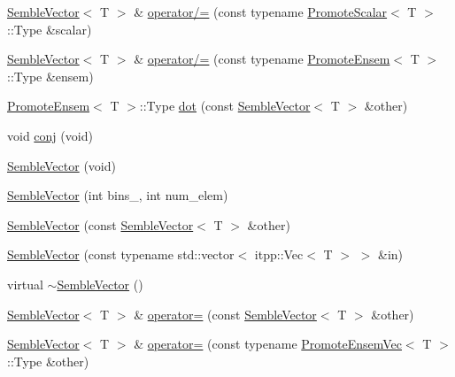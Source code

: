 \begin{DoxyCompactItemize}
\mbox{\hyperlink{structSEMBLE_1_1SembleVector}{Semble\+Vector}}$<$ T $>$ \& \mbox{\hyperlink{structSEMBLE_1_1SembleVector_a4158fb12d451d53f12b9f922d8106630}{operator/=}} (const typename \mbox{\hyperlink{structSEMBLE_1_1PromoteScalar}{Promote\+Scalar}}$<$ T $>$\+::Type \&scalar)
\item 
\mbox{\hyperlink{structSEMBLE_1_1SembleVector}{Semble\+Vector}}$<$ T $>$ \& \mbox{\hyperlink{structSEMBLE_1_1SembleVector_a9533ef56ccd7f84ae674b3ab1c378641}{operator/=}} (const typename \mbox{\hyperlink{structSEMBLE_1_1PromoteEnsem}{Promote\+Ensem}}$<$ T $>$\+::Type \&ensem)
\item 
\mbox{\hyperlink{structSEMBLE_1_1PromoteEnsem}{Promote\+Ensem}}$<$ T $>$\+::Type \mbox{\hyperlink{structSEMBLE_1_1SembleVector_a32f9480a402dc8d53c69fa1b09c03c82}{dot}} (const \mbox{\hyperlink{structSEMBLE_1_1SembleVector}{Semble\+Vector}}$<$ T $>$ \&other)
\item 
void \mbox{\hyperlink{structSEMBLE_1_1SembleVector_a82e42a0a34e836f565f54273df6e5e59}{conj}} (void)
\item 
\mbox{\hyperlink{structSEMBLE_1_1SembleVector_a71d201a7d5b2a62cea4034074fa210f5}{Semble\+Vector}} (void)
\item 
\mbox{\hyperlink{structSEMBLE_1_1SembleVector_a84340fccafe642a4754727fbc95e6356}{Semble\+Vector}} (int bins\+\_\+, int num\+\_\+elem)
\item 
\mbox{\hyperlink{structSEMBLE_1_1SembleVector_a929ee26afcab4cb287ad02440bb6bde2}{Semble\+Vector}} (const \mbox{\hyperlink{structSEMBLE_1_1SembleVector}{Semble\+Vector}}$<$ T $>$ \&other)
\item 
\mbox{\hyperlink{structSEMBLE_1_1SembleVector_a68bd844cdccf381b1445e91c7ad85d6b}{Semble\+Vector}} (const typename std\+::vector$<$ itpp\+::\+Vec$<$ T $>$ $>$ \&in)
\item 
virtual \mbox{\hyperlink{structSEMBLE_1_1SembleVector_af907835fbc4536922499383bfa6a5fd9}{$\sim$\+Semble\+Vector}} ()
\item 
\mbox{\hyperlink{structSEMBLE_1_1SembleVector}{Semble\+Vector}}$<$ T $>$ \& \mbox{\hyperlink{structSEMBLE_1_1SembleVector_ae00dd483d5c7c42e0a174aff1df7b52e}{operator=}} (const \mbox{\hyperlink{structSEMBLE_1_1SembleVector}{Semble\+Vector}}$<$ T $>$ \&other)
\item 
\mbox{\hyperlink{structSEMBLE_1_1SembleVector}{Semble\+Vector}}$<$ T $>$ \& \mbox{\hyperlink{structSEMBLE_1_1SembleVector_ab62457b0d29303d0aa977eb75101c81e}{operator=}} (const typename \mbox{\hyperlink{structSEMBLE_1_1PromoteEnsemVec}{Promote\+Ensem\+Vec}}$<$ T $>$\+::Type \&other)

\end{DoxyCompactItemize}
